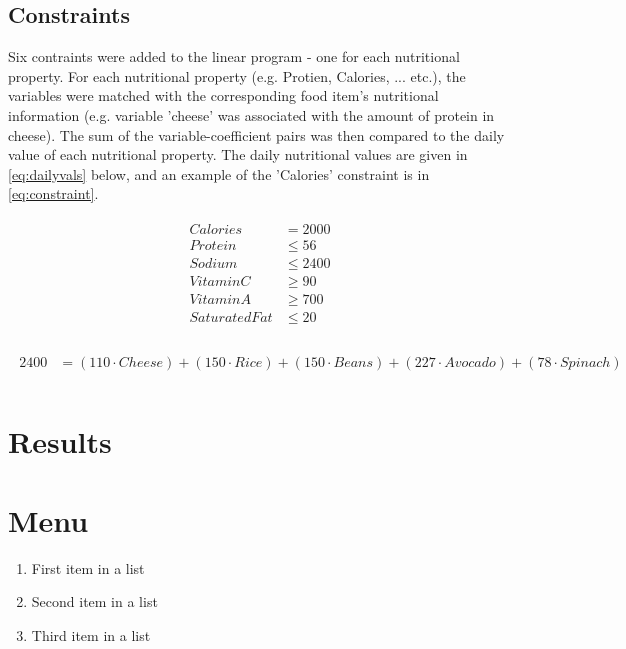 \documentclass[paper=a4, fontsize=11pt]{scrartcl}
\numberwithin{equation}{section}		%
\numberwithin{figure}{section}			%
\numberwithin{table}{section}				%
\begin{document}
\subsection{Constraints}
Six contraints were added to the linear program - one for each nutritional property. For each nutritional property (e.g. Protien, Calories, ... etc.), the variables were matched with the corresponding food item's nutritional information (e.g. variable 'cheese' was associated with the amount of protein in cheese). The sum of the variable-coefficient pairs was then compared to the daily value of each nutritional property. The daily nutritional values are given in \eqref{eq:dailyvals} below, and an example of the 'Calories' constraint is in \eqref{eq:constraint}.

\begin{align}
  \begin{split}
    Calories &= 2000\\
    Protein &\le 56 \\
    Sodium &\le 2400 \\
    Vitamin C &\ge 90 \\
    Vitamin A &\ge 700\\
    Saturated Fat &\le 20\\
  \end{split}
  \label{eq:dailyvals}
\end{align}


\begin{align} 
	\begin{split}
	2400 	&= (110 \cdot Cheese) + (150 \cdot Rice) + (150 \cdot Beans) + (227 \cdot Avocado) + (78 \cdot Spinach) \\
	\end{split}
    \label{eq:constraint}
\end{align}

\section{Results}



\section{Menu}

\begin{enumerate}
	\item First item in a list 
	\item Second item in a list 
	\item Third item in a list
\end{enumerate}
\end{document}
